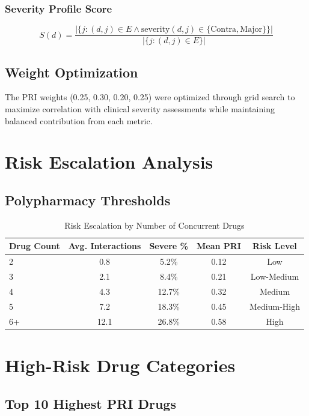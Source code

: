 \documentclass[11pt,a4paper]{article}
\begin{document}
\subsubsection{Severity Profile Score}
\begin{equation}
S(d) = \frac{|\{j : (d,j) \in E \land \text{severity}(d,j) \in \{\text{Contra}, \text{Major}\}\}|}{|\{j : (d,j) \in E\}|}
\end{equation}

\subsection{Weight Optimization}

The PRI weights (0.25, 0.30, 0.20, 0.25) were optimized through grid search to maximize correlation with clinical severity assessments while maintaining balanced contribution from each metric.

\section{Risk Escalation Analysis}

\subsection{Polypharmacy Thresholds}

\begin{table}[H]
\centering
\caption{Risk Escalation by Number of Concurrent Drugs}
\label{tab:risk_escalation}
\begin{tabular}{lcccc}
\toprule
\textbf{Drug Count} & \textbf{Avg. Interactions} & \textbf{Severe \%} & \textbf{Mean PRI} & \textbf{Risk Level} \\
\midrule
2 & 0.8 & 5.2\% & 0.12 & Low \\
3 & 2.1 & 8.4\% & 0.21 & Low-Medium \\
4 & 4.3 & 12.7\% & 0.32 & Medium \\
5 & 7.2 & 18.3\% & 0.45 & Medium-High \\
6+ & 12.1 & 26.8\% & 0.58 & High \\
\bottomrule
\end{tabular}
\end{table}

\section{High-Risk Drug Categories}

\subsection{Top 10 Highest PRI Drugs}
\end{document}
